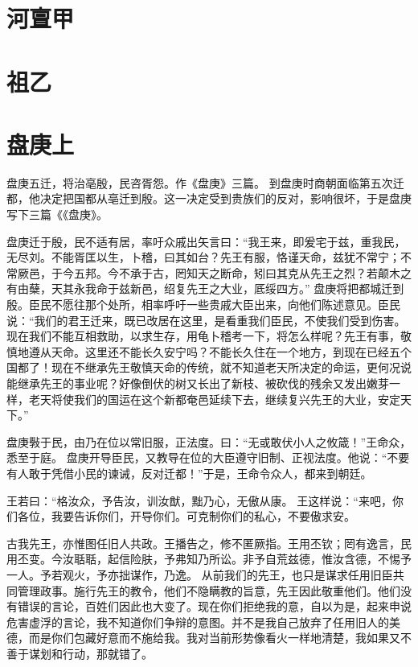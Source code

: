 \documentclass[12pt,UTF8]{ctexbook}
\begin{document}
\chapter{河亶甲}
\chapter{祖乙}
\chapter{盘庚上}

盘庚五迁，将治亳殷，民咨胥怨。作《盘庚》三篇。
到盘庚时商朝面临第五次迁都，他决定把国都从亳迁到殷。这一决定受到贵族们的反对，影响很坏，于是盘庚写下三篇《《盘庚》。

盘庚迁于殷，民不适有居，率吁众戚出矢言曰：“我王来，即爰宅于兹，重我民，无尽刘。不能胥匡以生，卜稽，曰其如台？先王有服，恪谨天命，兹犹不常宁；不常厥邑，于今五邦。今不承于古，罔知天之断命，矧曰其克从先王之烈？若颠木之有由蘖，天其永我命于兹新邑，绍复先王之大业，厎绥四方。”
盘庚将把都城迁到殷。臣民不愿往那个处所，相率呼吁一些贵戚大臣出来，向他们陈述意见。臣民说：“我们的君王迁来，既已改居在这里，是看重我们臣民，不使我们受到伤害。现在我们不能互相救助，以求生存，用龟卜稽考一下，将怎么样呢？先王有事，敬慎地遵从天命。这里还不能长久安宁吗？不能长久住在一个地方，到现在已经五个国都了！现在不继承先王敬慎天命的传统，就不知道老天所决定的命运，更何况说能继承先王的事业呢？好像倒伏的树又长出了新枝、被砍伐的残余又发出嫩芽一样，老天将使我们的国运在这个新都奄邑延续下去，继续复兴先王的大业，安定天下。”

盘庚斅于民，由乃在位以常旧服，正法度。曰：“无或敢伏小人之攸箴！”王命众，悉至于庭。
盘庚开导臣民，又教导在位的大臣遵守旧制、正视法度。他说：“不要有人敢于凭借小民的谏诫，反对迁都！”于是，王命令众人，都来到朝廷。

王若曰：“格汝众，予告汝，训汝猷，黜乃心，无傲从康。
王这样说：“来吧，你们各位，我要告诉你们，开导你们。可克制你们的私心，不要傲求安。

古我先王，亦惟图任旧人共政。王播告之，修不匿厥指。王用丕钦；罔有逸言，民用丕变。今汝聒聒，起信险肤，予弗知乃所讼。非予自荒兹德，惟汝含德，不惕予一人。予若观火，予亦拙谋作，乃逸。
从前我们的先王，也只是谋求任用旧臣共同管理政事。施行先王的教令，他们不隐瞒教的旨意，先王因此敬重他们。他们没有错误的言论，百姓们因此也大变了。现在你们拒绝我的意，自以为是，起来申说危害虚浮的言论，我不知道你们争辩的意图。并不是我自己放弃了任用旧人的美德，而是你们包藏好意而不施给我。我对当前形势像看火一样地清楚，我如果又不善于谋划和行动，那就错了。
\end{document}
